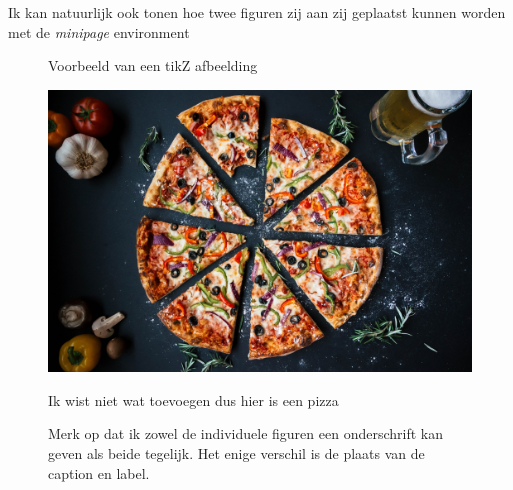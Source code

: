 \documentclass{article}
\begin{document}
Ik kan natuurlijk ook tonen hoe twee figuren zij aan zij geplaatst kunnen worden met de \textit{minipage} environment

\begin{figure}[!h]
    \centering
    \begin{minipage}{0.45\textwidth}
            \centering%
            \caption{Voorbeeld van een tikZ afbeelding}
            \label{fig:sketch}
    \end{minipage}%
    \hspace{0.05\textwidth}
    \begin{minipage}{0.45\textwidth}
        \includegraphics[width=\textwidth]{img/pizza.jpeg}
        \caption{Ik wist niet wat toevoegen dus hier is een pizza}
        \label{fig:pizza}
    \end{minipage}
    \caption{Merk op dat ik zowel de individuele figuren een onderschrift kan geven als beide tegelijk. Het enige verschil is de plaats van de caption en label.}
    \label{fig:minipage_example}
\end{figure}
\end{document}
